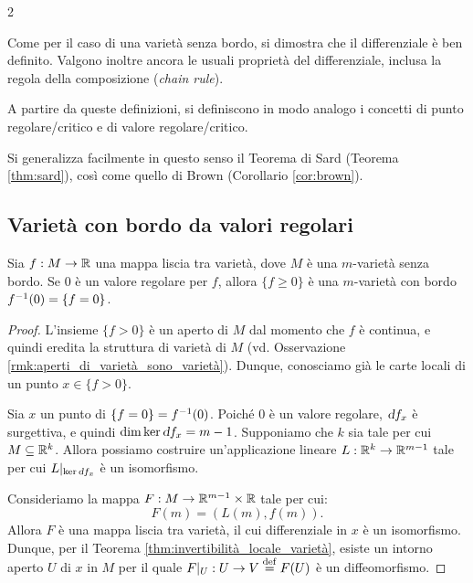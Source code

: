 \begin{multicols*}{2}
    \begin{remark}
        Come per il caso di una varietà senza bordo, si dimostra che il
        differenziale è ben definito. Valgono inoltre ancora le usuali
        proprietà del differenziale, inclusa la regola della composizione
        (\textit{chain rule}).
    \end{remark}

    \begin{remark}
        A partire da queste definizioni, si definiscono in modo analogo i
        concetti di punto regolare/critico e di valore regolare/critico. \smallskip

        Si generalizza facilmente in questo senso
        il Teorema di Sard (Teorema \ref{thm:sard}), così come quello di
        Brown (Corollario \ref{cor:brown}).
    \end{remark}

    \subsection{Varietà con bordo da valori regolari}

    \begin{theorem} \label{thm:varietà_bordata_da_valore_regolare_su_R}
        Sia $f : M \to \mathbb{R}$ una mappa liscia tra varietà, dove $M$ è una $m$-varietà senza bordo. Se
        $0$ è un valore regolare per $f$, allora $\{ f \geq 0 \}$ è una
        $m$-varietà con bordo $f^{-1}(0) = \{f = 0\}$.
    \end{theorem}

    \begin{proof}
        L'insieme $\{f > 0\}$ è un aperto di $M$ dal momento che $f$ è continua, e quindi
        eredita la struttura di varietà di $M$ (vd. Osservazione \ref{rmk:aperti_di_varietà_sono_varietà}).
        Dunque, conosciamo già le carte locali di un punto $x \in \{f > 0\}$. \smallskip

        Sia $x$ un punto di $\{f = 0\} = f^{-1}(0)$. Poiché $0$ è un valore regolare, $\dif f_x$ è
        surgettiva, e quindi $\dim \ker \dif f_x = m - 1$. Supponiamo che $k$ sia tale per cui $M \subseteq \mathbb{R}^k$.
        Allora possiamo costruire un'applicazione lineare $L : \mathbb{R}^k \to \mathbb{R}^{m-1}$ tale per cui
        $\restr{L}{\ker \dif f_x}$ è un isomorfismo. \smallskip

        Consideriamo la mappa $F : M \to \mathbb{R}^{m-1} \times \mathbb{R}$ tale per cui:
        \[
            F(m) = (L(m), f(m)).
        \]
        Allora $F$ è una mappa liscia tra varietà, il cui differenziale in $x$ è un isomorfismo. Dunque, per il
        Teorema \ref{thm:invertibilità_locale_varietà}, esiste un intorno aperto $U$ di $x$ in $M$ per il quale
        $F\arrowvert_{U} : U \to V \overset{\mathrm{def}}{=} F(U)$ è un diffeomorfismo. \smallskip


\end{proof}
\end{multicols*}
